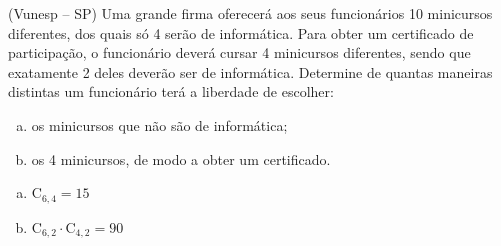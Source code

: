 \begin{ex}
(Vunesp – SP) Uma grande firma oferecerá aos seus funcionários 10 minicursos diferentes, dos quais só 4 serão de informática. Para obter um certificado de participação, o funcionário deverá cursar 4 minicursos diferentes, sendo que exatamente 2 deles deverão ser de informática. Determine de quantas maneiras distintas um funcionário terá a liberdade de escolher:
   \begin{enumerate}[(a)]
   \item os minicursos que não são de informática;
   \item os 4 minicursos, de modo a obter um certificado.
   \end{enumerate}
     \begin{sol}
       \phantom{A}
        \begin{enumerate} [(a)]
            \item $\mathrm{C}_{6,4}=15$
            \item $\mathrm{C}_{6,2}\cdot\mathrm{C}_{4,2}=90$
        \end{enumerate}
     \end{sol}
\end{ex}